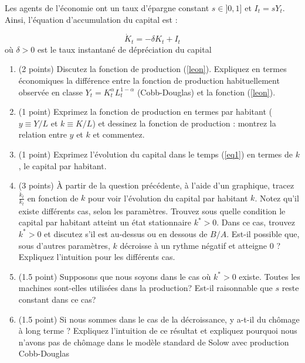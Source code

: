 \documentclass{article}
\begin{document}
Les agents de l’économie ont un taux d’épargne constant \( s \in]0,1] \) et $I_t = s Y_t $.  Ainsi, l’équation d’accumulation du capital est :

\begin{equation}\label{eq1}
    \dot{K}_t = -\delta K_t + I_t 
\end{equation}
où \( \delta > 0 \) est le taux instantané de dépréciation du capital



\begin{enumerate}
    \item (2 points) Discutez la fonction de production (\ref{leon}). Expliquez en termes économiques la différence entre la fonction de production habituellement observée en classe $Y_t = K_t^{\alpha} L_t^{1-\alpha}$ (Cobb-Douglas) et la fonction (\ref{leon}).

\item (1 point) Exprimez la fonction de production en termes par habitant ($y\equiv Y/L$ et $k\equiv K/L$) et dessinez la fonction de production : montrez la relation entre $y$ et $k$ et commentez.

\item (1 point) Exprimez l'évolution du capital dans le temps (\ref{eq1}) en termes de $k$, le capital par habitant.
\item (3 points) À partir de la question précédente, à l'aide d'un graphique, tracez $\frac{\dot{k}_t}{k_t}$ en fonction de $k$ pour voir l'évolution du capital par habitant $k$. Notez qu'il existe différents cas, selon les paramètres. Trouvez sous quelle condition le capital par habitant atteint un état stationnaire $k^\ast>0$. Dans ce cas, trouvez $k^\ast>0$ et discutez s'il est au-dessus ou en dessous de $B/A$. Est-il possible que, sous d'autres paramètres, $k$ décroisse à un rythme négatif et atteigne 0 ? Expliquez l'intuition pour les différents cas.

\item (1.5 point) Supposons que nous soyons dans le cas où $k^\ast>0$ existe.   Toutes les machines sont-elles utilisées dans la production? Est-il raisonnable que $s$ reste constant dans ce cas?

\item (1.5 point) Si nous sommes dans le cas de la décroissance, y a-t-il du chômage à long terme ? Expliquez l'intuition de ce résultat et expliquez pourquoi nous n'avons pas de chômage dans le modèle standard de Solow avec production Cobb-Douglas
\end{enumerate}
\end{document}
